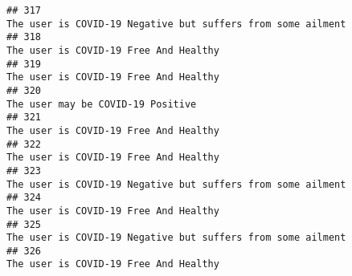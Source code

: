 \documentclass[
]{article}
\begin{document}
\begin{verbatim}
## 317                                                                                                                                                                                                        The user is COVID-19 Negative but suffers from some ailment
## 318                                                                                                                                                                                                                              The user is COVID-19 Free And Healthy
## 319                                                                                                                                                                                                                              The user is COVID-19 Free And Healthy
## 320                                                                                                                                                                                                                                  The user may be COVID-19 Positive
## 321                                                                                                                                                                                                                              The user is COVID-19 Free And Healthy
## 322                                                                                                                                                                                                                              The user is COVID-19 Free And Healthy
## 323                                                                                                                                                                                                        The user is COVID-19 Negative but suffers from some ailment
## 324                                                                                                                                                                                                                              The user is COVID-19 Free And Healthy
## 325                                                                                                                                                                                                        The user is COVID-19 Negative but suffers from some ailment
## 326                                                                                                                                                                                                                              The user is COVID-19 Free And Healthy

\end{verbatim}
\end{document}
